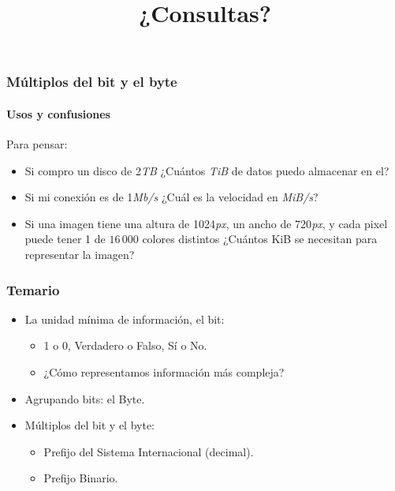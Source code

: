 \documentclass[11pt,a4paper,spanish]{beamer}
\begin{document}
\begin{frame}

\frametitle{Múltiplos del bit y el byte}

\framesubtitle{Usos y confusiones}

Para pensar:

\begin{itemize}
    \item Si compro un disco de 2\emph{TB} ¿Cuántos \emph{TiB} de datos puedo
        almacenar en el?
    \item Si mi conexión es de 1\emph{Mb/s} ¿Cuál es la velocidad en
        \emph{MiB/s}?
    \item Si una imagen tiene una altura de 1024\emph{px}, un ancho de
        720\emph{px}, y cada pixel puede tener 1 de $16\,000$ colores
        distintos ¿Cuántos KiB se necesitan para representar la imagen?
\end{itemize}

\end{frame}

\begin{frame}

    \frametitle{Temario}

\begin{itemize}

    \item La unidad mínima de información, el bit:
    \begin{itemize}
        \item 1 o 0, Verdadero o Falso, Sí o No.
        \item ¿Cómo representamos información más compleja?
    \end{itemize}

    \item Agrupando bits: el Byte.

    \item Múltiplos del bit y el byte:
    \begin{itemize}
        \item Prefijo del Sistema Internacional (decimal).
        \item Prefijo Binario.
    \end{itemize}

\end{itemize}
\end{frame}

\begin{frame}

\title{¿Consultas?}
\maketitle

\end{frame}

\setcounter{lastPage}{\number\value{page}}

\setcounter{page}{\number\value{lastPage}}
\end{document}
